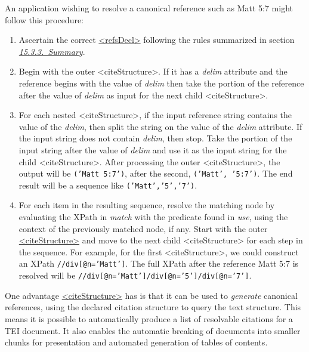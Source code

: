 An application wishing to resolve a canonical reference such as Matt 5:7 might follow this procedure: \begin{enumerate}
\item Ascertain the correct \hyperref[TEI.refsDecl]{<refsDecl>} following the rules summarized in section \textit{\hyperref[CCAS3]{15.3.3.\ Summary}}.
\item Begin with the outer <citeStructure>. If it has a {\itshape delim} attribute and the reference begins with the value of {\itshape delim} then take the portion of the reference after the value of {\itshape delim} as input for the next child <citeStructure>.
\item For each nested <citeStructure>, if the input reference string contains the value of the {\itshape delim}, then split the string on the value of the {\itshape delim} attribute. If the input string does not contain {\itshape delim}, then stop. Take the portion of the input string after the value of {\itshape delim} and use it as the input string for the child <citeStructure>. After processing the outer <citeStructure>, the output will be \texttt{('Matt 5:7')}, after the second, \texttt{('Matt', '5:7')}. The end result will be a sequence like \texttt{('Matt','5','7')}.
\item For each item in the resulting sequence, resolve the matching node by evaluating the XPath in {\itshape match} with the predicate found in {\itshape use}, using the context of the previously matched node, if any. Start with the outer \hyperref[TEI.citeStructure]{<citeStructure>} and move to the next child <citeStructure> for each step in the sequence. For example, for the first <citeStructure>, we could construct an XPath \texttt{//div[@n='Matt']}. The full XPath after the reference Matt 5:7 is resolved will be \texttt{//div[@n='Matt']/div[@n='5']/div[@n='7']}.
\end{enumerate} One advantage \hyperref[TEI.citeStructure]{<citeStructure>} has is that it can be used to \textit{generate} canonical references, using the declared citation structure to query the text structure. This means it is possible to automatically produce a list of resolvable citations for a TEI document. It also enables the automatic breaking of documents into smaller chunks for presentation and automated generation of tables of contents.\par
